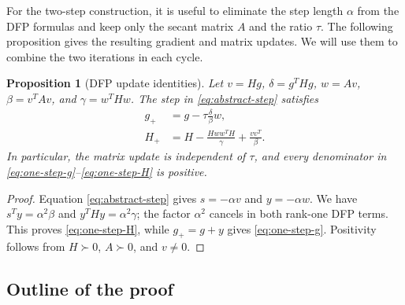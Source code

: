 \documentclass[11pt]{article}
\newtheorem{proposition}[theorem]{Proposition}
\begin{document}
For the two-step construction, it is useful to eliminate the step length
$\alpha$ from the DFP formulas and keep only the secant matrix $A$ and the
ratio $\tau$.  The following proposition gives the resulting gradient and
matrix updates.  We will use them to combine the two iterations in each cycle.

\begin{proposition}[DFP update identities]\label{prop:one-step}
Let $v=Hg$, $\delta=g^THg$, $w=Av$, $\beta=v^TAv$, and
$\gamma=w^THw$.  The step in \eqref{eq:abstract-step} satisfies
\begin{align}
g_+&=g-\tau\frac{\delta}{\beta}w,
\label{eq:one-step-g}\\
H_+&=H-\frac{Hww^TH}{\gamma}+\frac{vv^T}{\beta}.
\label{eq:one-step-H}
\end{align}
In particular, the matrix update is independent of $\tau$, and every
denominator in \eqref{eq:one-step-g}--\eqref{eq:one-step-H} is positive.
\end{proposition}

\begin{proof}
Equation \eqref{eq:abstract-step} gives $s=-\alpha v$ and
$y=-\alpha w$.  We have $s^Ty=\alpha^2\beta$ and
$y^THy=\alpha^2\gamma$; the factor $\alpha^2$ cancels in both rank-one DFP
terms.  This proves \eqref{eq:one-step-H}, while $g_+=g+y$ gives
\eqref{eq:one-step-g}.  Positivity follows from $H\succ0$, $A\succ0$, and
$v\ne0$.
\end{proof}

\subsection{Outline of the proof}
\end{document}
